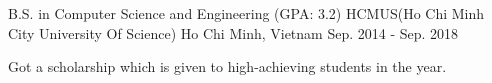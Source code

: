 

\begin{cventries}

  \cventry
    {B.S. in Computer Science and Engineering (GPA: 3.2)} %
    {HCMUS(Ho Chi Minh City University Of Science)} %
    {Ho Chi Minh, Vietnam} %
    {Sep. 2014 - Sep. 2018} %
    {
      \begin{cvitems} %
        \item {Got a scholarship which is given to high-achieving students in the year.}
      \end{cvitems}
    }

\end{cventries}
